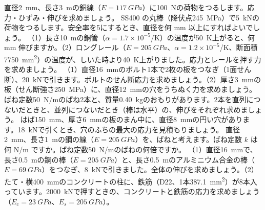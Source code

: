 \bkendproblems
{}
\bkproblem 直径\qty{2}{mm}、長さ\qty{3}{m}の銅線（$E=\qty{117}{GPa}$）に\qty{100}{N}の荷物をつるします。応力・ひずみ・伸びを求めましょう。
\bkproblem SS400 の丸棒（降伏点\qty{245}{MPa}）で\qty{5}{kN}の荷物をつるします。安全率を5にするとき、直径を何 mm 以上にすればよいでしょう。
\bkproblem （1）長さ\qty{10}{m}の銅管（$\alpha=1.7\times10^{-5}$/K）の温度が\qty{50}{K}上がると、何 mm 伸びますか。（2）ロングレール（$E=\qty{205}{GPa}$、$\alpha=1.2\times10^{-5}$/K、断面積\qty{7750}{mm^2}）の温度が、しいた時より\qty{40}{K}上がりました。応力とレールを押す力を求めましょう。
\bkproblem （1）直径\qty{16}{mm}のボルト1本で2枚の板をつなぎ（1面せん断）、\qty{20}{kN}で引きます。ボルトのせん断応力を求めましょう。（2）厚さ\qty{3}{mm}の板（せん断強さ\qty{250}{MPa}）に、直径\qty{12}{mm}の穴をうちぬく力を求めましょう。
\bkproblem ばね定数\qty{50}{N/m}のばね2本と、質量\qty{0.40}{kg}のおもりがあります。2本を直列につないだときと、並列につないだとき（棒は水平）の、伸びをそれぞれ求めましょう。
\bkproblem はば\qty{150}{mm}、厚さ\qty{6}{mm}の板のまん中に、直径\qty{8}{mm}の円い穴があります。\qty{18}{kN}で引くとき、穴のふちの最大の応力を見積もりましょう。
\bkproblem 直径\qty{2}{mm}、長さ\qty{1}{m}の鋼の線（$E=\qty{205}{GPa}$）を、ばねと考えます。ばね定数 $k$ は何 N/m ですか。ばね定数\qty{50}{N/m}のばねの何倍ですか。
\bkproblem （1）直径\qty{16}{mm}で、長さ\qty{0.5}{m}の鋼の棒（$E=\qty{205}{GPa}$）と、長さ\qty{0.5}{m}のアルミニウム合金の棒（$E=\qty{69}{GPa}$）をつなぎ、\qty{8}{kN}で引きました。全体の伸びを求めましょう。（2）たて・横\qty{400}{mm}のコンクリートの柱に、鉄筋（D22、1本\qty{387.1}{mm^2}）が8本入っています。\qty{2000}{kN}で押すときの、コンクリートと鉄筋の応力を求めましょう（$E_c=\qty{23}{GPa}$、$E_s=\qty{205}{GPa}$）。
